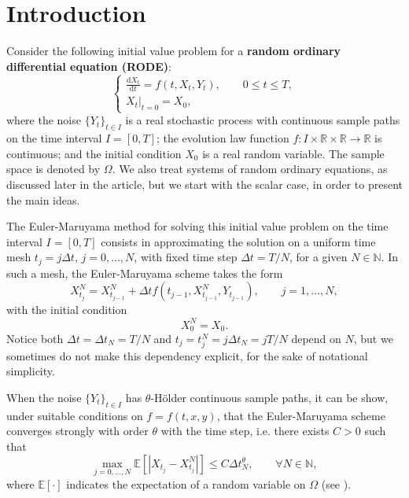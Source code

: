\documentclass[reqno,12pt]{amsart}
\theoremstyle{plain}%
\theoremstyle{definition}
\begin{document}
\maketitle

\section{Introduction}

Consider the following initial value problem for a \textbf{random ordinary differential equation (RODE)}:
\begin{equation}
  \label{rodeeq}
  \begin{cases}
    \displaystyle \frac{\mathrm{d}X_t}{\mathrm{d} t} = f(t, X_t, Y_t), \qquad 0 \leq t \leq T, \\
    \left. X_t \right|_{t = 0} = X_0,
  \end{cases}
\end{equation}
where the noise $\{Y_t\}_{t\in I}$ is a real stochastic process with continuous sample paths on the time interval $I=[0, T]$; the evolution law function $f:I \times \mathbb{R} \times\mathbb{R} \rightarrow \mathbb{R}$ is continuous; and the initial condition $X_0$ is a real random variable. The sample space is denoted by $\Omega$. We also treat systems of random ordinary equations, as discussed later in the article, but we start with the scalar case, in order to present the main ideas.

The Euler-Maruyama method for solving this initial value problem on the time interval $I = [0, T]$ consists in approximating the solution on a uniform time mesh $t_j = j\Delta t$, $j = 0, \ldots, N$, with fixed time step $\Delta t = T/N$, for a given $N\in \mathbb{N}$. In such a mesh, the Euler-Maruyama scheme takes the form
\begin{equation}
  \label{emscheme}
  X_{t_j}^N = X_{t_{j-1}}^N + \Delta t f(t_{j-1}, X_{t_{j-1}}^N, Y_{t_{j-1}}), \qquad j = 1, \ldots, N,
\end{equation}
with the initial condition
\begin{equation}
  \label{iccondition}
  X_0^N = X_0.
\end{equation}
Notice both $\Delta t = \Delta t_N = T/N$ and $t_j = t_j^N = j\Delta t_N = jT/N$ depend on $N$, but we sometimes do not make this dependency explicit, for the sake of notational simplicity.

When the noise $\{Y_t\}_{t\in I}$ has $\theta$-H\"older continuous sample paths, it can be show, under suitable conditions on $f=f(t, x, y)$, that the Euler-Maruyama scheme converges strongly with order $\theta$ with the time step, i.e. there exists $C > 0$ such that
\begin{equation}
    \max_{j=0, \ldots, N}\mathbb{E}\left[ \left| X_{t_j} - X_{t_j}^N \right| \right] \leq C \Delta t_N^\theta, \qquad \forall N \in \mathbb{N},
\end{equation}
where $\mathbb{E}[\cdot]$ indicates the expectation of a random variable on $\Omega$ (see \cite{}).
\end{document}

